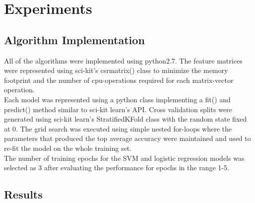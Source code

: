 \section{Experiments}\label{sec:q2}

\subsection{Algorithm Implementation}
All of the algorithms were implemented using python2.7. The feature matrices were represented using sci-kit's csrmatrix() class to minimize the memory footprint and the number of cpu-operations required for each matrix-vector operation.\\
Each model was represented using a python class implementing a fit() and predict() method similar to sci-kit learn's API. Cross validation splits were generated using sci-kit learn's StratifiedKFold class with the random state fixed at 0. The grid search was executed using simple nested for-loops where the parameters that produced the top average accuracy were maintained and used to re-fit the model on the whole training set.\\
The number of training epochs for the SVM and logistic regression models was selected as 3 after evaluating the performance for epochs in the range 1-5.


\subsection{Results}

